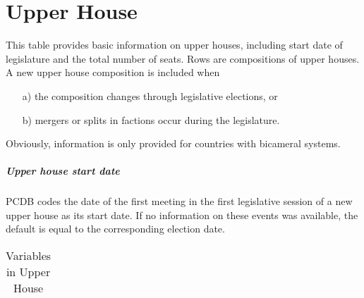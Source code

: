 \section{Upper House}\label{sec_upper_house}
This table provides basic information on upper houses, including start date of legislature and the total number of seats. 
Rows are compositions of upper houses. 
A new upper house composition is included when
\begin{itemize}\itemsep-4pt 
\item[a)]the composition changes through legislative elections, or
\item[b)]mergers or splits in factions occur during the legislature.
\end{itemize} 
Obviously, information is only provided for countries with bicameral systems.

\subparagraph{Upper house start date}
PCDB codes the date of the first meeting in the first legislative session of a new upper house as its start date. If no information on these events was available, the default is equal to the corresponding election date. 

\begin{center}
\begin{longtable}{L{4cm} L{6cm} L{3cm}}
\caption{Variables in Upper House\label{tab_upper_house}}


\end{longtable}
\end{center}
